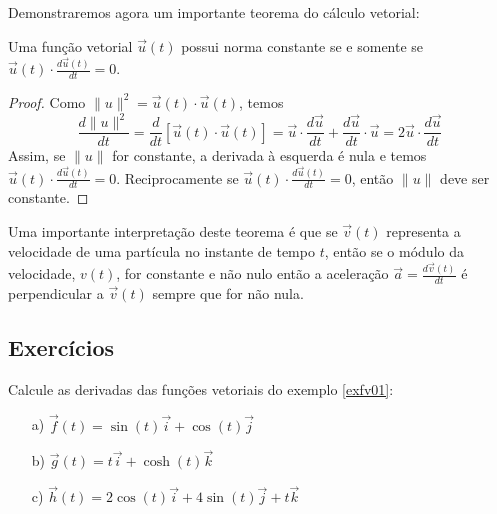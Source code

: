 Demonstraremos agora um importante teorema do cálculo vetorial:
\begin{teo}\label{teodernormacst} Uma função vetorial $\vec{u}(t)$ possui norma constante se e somente se $\vec{u}(t)\cdot\frac{d\vec{u}(t)}{dt}=0$. 
\end{teo}
\begin{proof} Como $\|u\|^2=\vec{u}(t)\cdot\vec{u}(t)$, temos
$$\frac{d \|u\|^2}{dt}=\frac{d}{dt}\left[\vec{u}(t)\cdot\vec{u}(t)\right]=\vec{u}\cdot\frac{d\vec{u}}{dt}+\frac{d\vec{u}}{dt}\cdot\vec{u}=2\vec{u}\cdot\frac{d\vec{u}}{dt}$$
Assim, se $\|u\|$ for constante, a derivada à esquerda é nula e temos $\vec{u}(t)\cdot\frac{d\vec{u}(t)}{dt}=0$. Reciprocamente se $\vec{u}(t)\cdot\frac{d\vec{u}(t)}{dt}=0$, então $\|u\|$ deve ser constante.
\end{proof}
\begin{obs} Uma importante interpretação deste teorema é que se $\vec{v}(t)$ representa a velocidade de uma partícula no instante de tempo $t$, então se o módulo da velocidade, $v(t)$, for constante e não nulo então a aceleração $\vec{a}=\frac{d\vec{v}(t)}{dt}$ é perpendicular a $\vec{v}(t)$ sempre que for não nula.  
\end{obs}







\subsection*{Exercícios}

\begin{exer}Calcule as derivadas das funções vetoriais do exemplo \ref{exfv01}:
\begin{itemize}
\item [a)] $\vec{f}(t)=\sin(t)\vec{i}+\cos(t)\vec{j}$
\item [b)] $\vec{g}(t)=t \vec{i}+\cosh(t)\vec{k}$
\item [c)] $\vec{h}(t)=2\cos(t)\vec{i}+4\sin(t)\vec{j}+t\vec{k}$
\end{itemize}
\end{exer}

